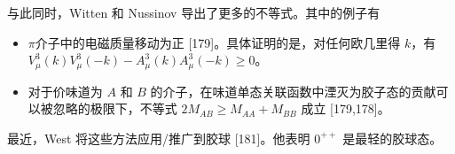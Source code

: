 与此同时，Witten 和 Nussinov 导出了更多的不等式。其中的例子有
\begin{itemize}
  \item $\pi$介子中的电磁质量移动为正 [179]。具体证明的是，对任何欧几里得 $k$，有 $V_\mu^3(k)V_\mu^3(-k) - A_\mu^3(k)A_\mu^3(-k) \ge 0$。
  \item 对于价味道为 $A$ 和 $B$ 的介子，在味道单态关联函数中湮灭为胶子态的贡献可以被忽略的极限下，不等式 $2M_{AB} \ge M_{AA} + M_{BB}$ 成立 [179,178]。
\end{itemize}

最近，West 将这些方法应用/推广到胶球 [181]。他表明 $0^{++}$ 是最轻的胶球态。
